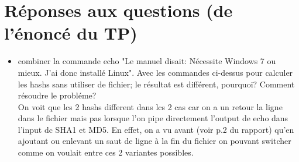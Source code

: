 %
\section{Réponses aux questions (de l'énoncé du TP)}
\begin{frame}{\secname}
%

\begin{itemize}
    \item combiner la commande echo "Le manuel disait: Nécessite Windows 7 ou mieux. J'ai donc
installé Linux". Avec les commandes ci-dessus pour calculer les hashs sans utiliser de fichier;
le résultat est différent, pourquoi? Comment résoudre le probléme? \\

    On voit que lcs 2 hashs different dans lcs 2 cas car on a un retour la ligne dans le fichier mais pas
lorsque l'on pipe directement l'output de echo dans l'input dc SHA1 et MD5.
En effet, on a vu avant (voir p.2 du rapport) qu'en ajoutant ou enlevant un saut de ligne à la fin du fichier  on
pouvant switcher comme on voulait entre ces 2 variantes possibles.
\end{itemize}


\end{frame}
